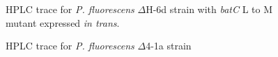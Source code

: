 		\setlength\fboxsep{5pt}
		\setlength\fboxrule{1.5pt}
		\begin{figure}[htbp]
		\centering
		\caption[HPLC trace for \textit{P. fluorescens} $ \Delta $H-6d strain with \textit{batC} L to M mutant expressed \textit{in trans}. ]{HPLC trace for \textit{P. fluorescens} $ \Delta $H-6d strain with \textit{batC} L to M mutant expressed \textit{in trans}.}
		\label{fig:hplcdeltahbatclm}
		\end{figure}					

		\setlength\fboxsep{5pt}
		\setlength\fboxrule{1.5pt}
		\begin{figure}[htbp]
		\centering
		\caption[HPLC trace for \textit{P. fluorescens} $ \Delta $4-1a strain. ]{HPLC trace for \textit{P. fluorescens} $ \Delta $4-1a strain}
		\label{fig:hplcdelta41a}
		\end{figure}	

